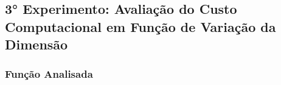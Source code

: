 \subsection{3° Experimento: Avaliação do Custo Computacional em Função de Variação da Dimensão}
    \subsubsection{Função Analisada}
    
\newpage